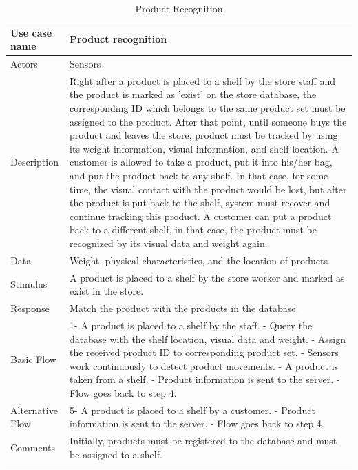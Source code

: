 \documentclass[11pt]{article}
\begin{document}
        
        
        \begin{table}[H]
        \begin{centering}
        \begin{tabular}{|p{2.5cm}|p{12cm}|}
        \hline
        Use case name & Product recognition  \\ \hline
        Actors        & Sensors \\ \hline
        Description   & Right after a product is placed to a shelf by the store staff and the product is marked as 'exist' on the store database, the corresponding ID which belongs to the same product set must be assigned to the product. After that point, until someone buys the product and leaves the store, product must be tracked by using its weight information, visual information, and shelf location. A customer is allowed to take a product, put it into his/her bag, and put the product back to any shelf. In that case, for some time, the visual contact with the product would be lost, but after the product is put back to the shelf, system must recover and continue tracking this product. A customer can put a product back to a different shelf, in that case, the product must be recognized by its visual data and weight again. \\ \hline
        Data          & Weight, physical characteristics, and the location of products. \\ \hline
        Stimulus      & A product is placed to a shelf by the store worker and marked as exist in the store. \\ \hline
        Response      & Match the product with the products in the database. \\ \hline
        Basic Flow    & 
        1- A product is placed to a shelf by the staff. \newline
        2- Query the database with the shelf location, visual data and weight. \newline
        3- Assign the received product ID to corresponding product set.
        \newline
        4- Sensors work continuously to detect product movements. \newline
        5- A product is taken from a shelf. \newline
        6- Product information is sent to the server. \newline
        7- Flow goes back to step 4. \\ \hline
        Alternative
            Flow      & 
        5- A product is placed to a shelf by a customer. \newline
        6- Product information is sent to the server. \newline
        7- Flow goes back to step 4. \\ \hline
        Comments      & Initially, products must be registered to the database and must be assigned to a shelf. \\ \hline
        
        \end{tabular}
        \caption{Product Recognition}
        \label{tab7}
        \end{centering}
        \end{table}    
\end{document}
